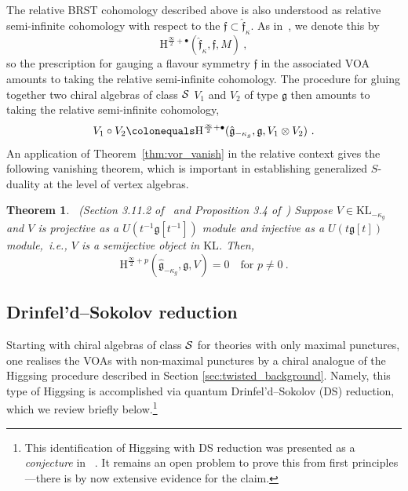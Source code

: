 \documentclass[a4paper]{article}
\newtheorem{thm}{Theorem}[section]
\def\SS{{\cal S}}
\def\gf{\mathfrak{g}}
\def \ff{\mathfrak{f}}
\def \ie{{\it i.e.}}
\def \KL{\mathrm{KL}}
\newcommand{\Hi}[1]{\mathrm{H}^{\frac{\infty}{2}+#1}}
\begin{document}
The relative BRST cohomology described above is also understood as relative semi-infinite cohomology with respect to the $\ff\subset\hat{\ff}_\kappa$. As in~\cite{Voronov:1993aw,Arakawa:2018egx}, we denote this by
\begin{equation}\label{eq:feig_rel}
    \Hi{\bullet}(\hat{\ff}_\kappa,\ff,M)~,
\end{equation}
so the prescription for gauging a flavour symmetry $\ff$ in the associated VOA amounts to taking the relative semi-infinite cohomology. The procedure for gluing together two chiral algebras of class $\SS$ $V_1$ and $V_2$ of type $\gf$ then amounts to taking the relative semi-infinite cohomology,
\begin{equation}
\label{eq:gauge_gluing}
    V_1\circ V_2\colonequals\Hi{\bullet}(\hat{\gf}_{-\kappa_g},\gf,V_1\otimes V_2)~.
\end{equation}
An application of Theorem~\ref{thm:vor_vanish} in the relative context gives the following vanishing theorem, which is important in establishing generalized $S$-duality at the level of vertex algebras.

\begin{thm}~\label{thm:gauge-van} {\rm (Section 3.11.2 of~\cite{Voronov:1993aw} and Proposition 3.4 of~\cite{Arakawa:2018egx})} Suppose $V\in \KL_{-\kappa_g}$ and $V$ is projective as a $U(t^{-1}\gf[t^{-1}])$ module and injective as a $U(t\gf[t])$ module,~\ie, $V$ is a semijective object in $\KL$. Then,
\begin{equation}
	\Hi{p}(\hat{\gf}_{-\kappa_g},\gf,V) = 0\quad \text{for } p\neq 0~.
\end{equation}
\end{thm}

\subsection{Drinfel'd--Sokolov reduction}
\label{subsec:DS_reduction}

Starting with chiral algebras of class $\SS$ for theories with only maximal punctures, one realises the VOAs with non-maximal punctures by a chiral analogue of the Higgsing procedure described in Section \ref{sec:twisted_background}. Namely, this type of Higgsing is accomplished via quantum Drinfel'd--Sokolov (DS) reduction, which we review briefly below.\footnote{This identification of Higgsing with DS reduction was presented as a \emph{conjecture} in ~\cite{Beem:2014rza}. It remains an open problem to prove this from first principles---there is by now extensive evidence for the claim.}
\end{document}
